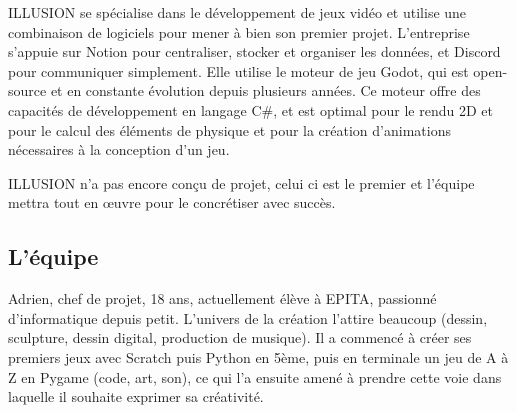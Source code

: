 \documentclass[12pt,a4paper]{article}
\begin{document}
ILLUSION se spécialise dans le développement de jeux vidéo et utilise une combinaison de logiciels pour mener à bien son premier projet. L'entreprise s'appuie sur Notion pour centraliser, stocker et organiser les données, et Discord pour communiquer simplement. Elle utilise le moteur de jeu Godot, qui est open-source et en constante évolution depuis plusieurs années. Ce moteur offre des capacités de développement en langage C\#, et est optimal pour le rendu 2D et pour le calcul des éléments de physique et pour la création d'animations nécessaires à la conception d'un jeu.

ILLUSION n'a pas encore conçu de projet, celui ci est le premier et l'équipe mettra tout en œuvre pour le concrétiser avec succès.

\clearpage

\subsection{L'équipe} 

Adrien, chef de projet, 18 ans, actuellement élève à EPITA, passionné d'informatique depuis petit. L'univers de la création l'attire beaucoup (dessin, sculpture, dessin digital, production de musique). Il a commencé à créer ses premiers jeux avec Scratch puis Python en 5ème, puis en terminale un jeu de A à Z en Pygame (code, art, son), ce qui l'a ensuite amené à prendre cette voie dans laquelle il souhaite exprimer sa créativité.
\end{document}
